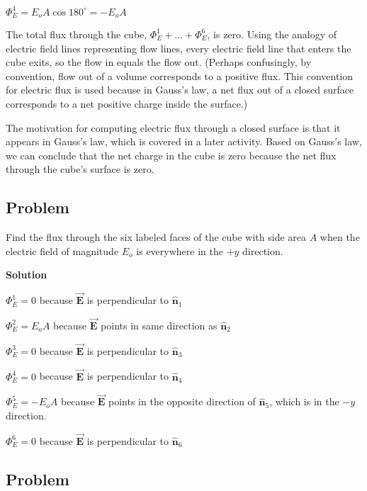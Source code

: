 \documentclass{article}
\newcommand{\bfvec}[1]{\vec{\mathbf{#1}}}
\begin{document}
$\Phi_E^{4}=E_oA\cos 180^\circ=-E_oA$

The total flux through the cube, $\Phi_E^1+...+\Phi_E^6$, is zero. Using the analogy of electric field lines representing flow lines, every electric field line that enters the cube exits, so the flow in equals the flow out. (Perhaps confusingly, by convention, flow out of a volume corresponds to a positive flux. This convention for electric flux is used because in Gauss's law, a net flux out of a closed surface corresponds to a net positive charge inside the surface.)

The motivation for computing electric flux through a closed surface is that it appears in Gauss's law, which is covered in a later activity. Based on Gauss's law, we can conclude that the net charge in the cube is zero because the net flux through the cube's surface is zero.

\ifsolutions

\else

\newpage
\fi

\subsection{Problem}



Find the flux through the six labeled faces of the cube with side area $A$ when the electric field of magnitude $E_o$ is everywhere in the $+y$ direction.

\ifsolutions
\textbf{Solution}

$\Phi_E^1=0$ because $\bfvec{E}$ is perpendicular to $\hat{\mathbf{n}}_1$

$\Phi_E^2=E_oA$ because $\bfvec{E}$ points in same direction as $\hat{\mathbf{n}}_2$

$\Phi_E^3=0$ because $\bfvec{E}$ is perpendicular to $\hat{\mathbf{n}}_3$

$\Phi_E^4=0$ because $\bfvec{E}$ is perpendicular to $\hat{\mathbf{n}}_4$

$\Phi_E^5=-E_oA$ because $\bfvec{E}$ points in the opposite direction of $\hat{\mathbf{n}}_5$, which is in the $-y$ direction.

$\Phi_E^6=0$ because $\bfvec{E}$ is perpendicular to $\hat{\mathbf{n}}_6$
\else

\newpage
\fi

\subsection{Problem}
\end{document}
